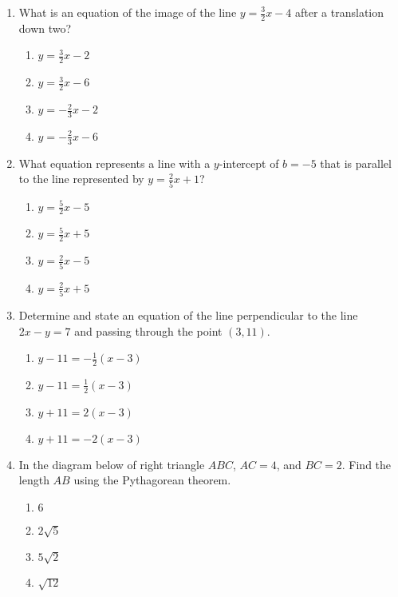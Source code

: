 \documentclass[12pt, twoside]{article}
\begin{document}
\begin{enumerate}
\item What is an equation of the image of the line $y=\frac{3}{2}x-4$ after a translation down two?
\begin{multicols}{2}
  \begin{enumerate}
    \item $y=\frac{3}{2}x-2$
    \item $y=\frac{3}{2}x-6$
    \item $y=-\frac{2}{3}x-2$
    \item $y=-\frac{2}{3}x-6$
  \end{enumerate}
\end{multicols}

\newpage
\item What equation represents a line with a $y$-intercept of $b=-5$ that is parallel to the line represented by $y=\frac{2}{5}x+1$?
  \begin{multicols}{2}
    \begin{enumerate}
      \item $y=\frac{5}{2}x-5$
      \item $y=\frac{5}{2}x+5$
      \item $y=\frac{2}{5}x-5$
      \item $y=\frac{2}{5}x+5$
    \end{enumerate}
  \end{multicols}

\item Determine and state an equation of the line perpendicular to the line\\ $2x-y=7$ and passing through the point $(3,11)$.
  \begin{multicols}{2}
    \begin{enumerate}
      \item $y-11=-\frac{1}{2}(x-3)$
      \item $y-11=\frac{1}{2}(x-3)$ 
      \item $y+11=2(x-3)$
      \item $y+11=-2(x-3)$
    \end{enumerate}
  \end{multicols}

\item In the diagram below of right triangle $ABC$, $AC=4$, and $BC=2$. Find the length $AB$ using the Pythagorean theorem.
  \begin{multicols}{2}
    \begin{enumerate}
      \item $6$
      \item $2\sqrt{5}$ 
      \item $5\sqrt{2}$
      \item $\sqrt{12}$ 
    \end{enumerate}
  \end{multicols}


\end{enumerate}
\end{document}
